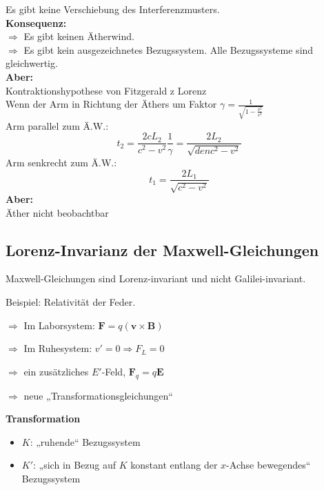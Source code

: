 \documentclass[titlepage,11pt,a4paper,ngerman]{report}
\renewcommand{\vec}[1]{\boldsymbol{#1}}
\begin{document}
Es gibt keine Verschiebung des Interferenzmusters.\\[5pt]
\textbf{Konsequenz:}\\
$ \Rightarrow $ Es gibt keinen Ätherwind.\\
$ \Rightarrow $ Es gibt kein ausgezeichnetes Bezugssystem. Alle Bezugssysteme sind gleichwertig.\\[5pt]
\textbf{Aber:}\\
Kontraktionshypothese von Fitzgerald z Lorenz\\
Wenn der Arm in Richtung der Äthers um Faktor $ \gamma = \frac{1}{\sqrt{1 - \frac{v^2}{c^2}}} $ \\
Arm parallel zum Ä.W.:
\begin{equation*}
t_2 = \frac{2cL_2}{c^2 - v^2} \frac{1}{\gamma} = \frac{2 L_2}{\sqrt{denc^2 - v^2}}
\end{equation*}
Arm senkrecht zum Ä.W.:
\begin{equation*}
t_1 = \frac{2L_1}{\sqrt{c^2 - v^2}}
\end{equation*}
\textbf{Aber:}\\
Äther nicht beobachtbar

\subsection{Lorenz-Invarianz der Maxwell-Gleichungen}%

Maxwell-Gleichungen sind Lorenz-invariant und nicht Galilei-invariant.

Beispiel: Relativität der Feder. 



$\Rightarrow$ Im Laborsystem: $\vec{F}=q(\vec{v}\times\vec{B})$

$\Rightarrow$ Im Ruhesystem: $v'=0\Rightarrow F_L=0$ \begin{LARGE}\lightning\end{LARGE}

$\Rightarrow$ ein zusätzliches $E'$-Feld, $\vec{F}_q=q\vec{E}$

$\Rightarrow$ neue „Transformationsgleichungen“

\textbf{Transformation}
\begin{itemize}
	\item $K$: „ruhende“ Bezugssystem
	\item $K'$: „sich in Bezug auf $K$ konstant entlang der $x$-Achse bewegendes“ Bezugssystem
\end{itemize}
\end{document}
